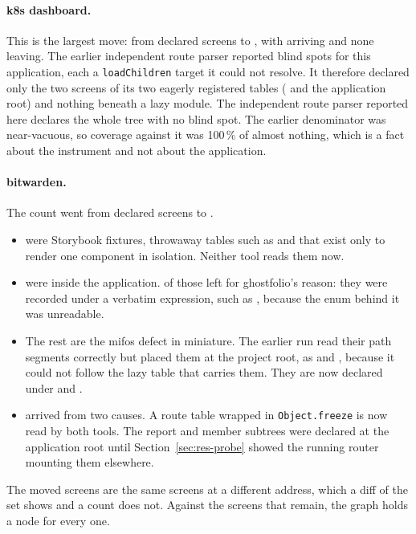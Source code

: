 \paragraph{k8s dashboard.} This is the largest move: from \RoundTwoEarlierOracleKdashDeclared{} declared screens to \RoundTwoEarlierOracleKdashNow{}, with \RoundTwoEarlierOracleKdashAdded{} arriving and none leaving. The earlier independent route parser reported \NodeAuditBlindSpotsKdash{} blind spots for this application, each a \texttt{loadChildren} target it could not resolve. It therefore declared only the two screens of its two eagerly registered tables ( and the application root) and nothing beneath a lazy module. The independent route parser reported here declares the whole tree with no blind spot. The earlier denominator was near-vacuous, so coverage against it was 100\,\% of almost nothing, which is a fact about the instrument and not about the application.

\paragraph{bitwarden.} The count went from \RoundTwoEarlierOracleBitwardenDeclared{} declared screens to \RoundTwoEarlierOracleBitwardenNow{}.
\begin{itemize}
\item \RoundTwoEarlierOracleBitwardenStorybook{} were Storybook fixtures, throwaway tables such as  and  that exist only to render one component in isolation. Neither tool reads them now.
\item \RoundTwoEarlierOracleBitwardenInside{} were inside the application. \RoundTwoEarlierOracleBitwardenInsideVerbatim{} of those left for ghostfolio's reason: they were recorded under a verbatim expression, such as , because the enum behind it was unreadable.
\item The rest are the mifos defect in miniature. The earlier run read their path segments correctly but placed them at the project root, as  and , because it could not follow the lazy table that carries them. They are now declared under  and .
\item \RoundTwoEarlierOracleBitwardenAdded{} arrived from two causes. A route table wrapped in \texttt{Object.freeze} is now read by both tools. The report and member subtrees were declared at the application root until Section~\ref{sec:res-probe} showed the running router mounting them elsewhere.
\end{itemize}
The moved screens are the same screens at a different address, which a diff of the set shows and a count does not. Against the \RoundTwoEarlierOracleBitwardenNow{} screens that remain, the graph holds a node for every one.

